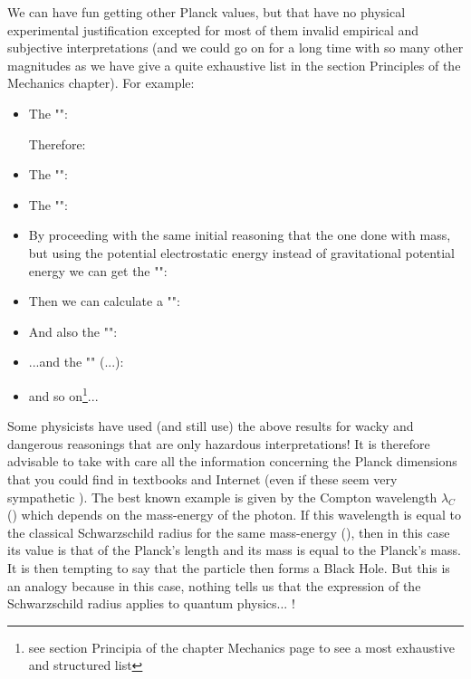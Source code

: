 	We can have fun getting other Planck values, but that have no physical experimental justification excepted for most of them invalid empirical and subjective interpretations (and we could go on for a long time with so many other magnitudes as we have give a quite exhaustive list in the section Principles of the Mechanics chapter). For example:
	\begin{itemize}
		\item The "":
		
		Therefore:
		
	
		\item The "":
		
	
		\item The "":
		
		
		\item By proceeding with the same initial reasoning that the one done with mass, but using the potential electrostatic energy instead of gravitational potential energy we can get the "":
		

		\item Then we can calculate a "":
		
		
		\item And also the "":
		
		
		\item ...and the "" (...):
		
	
		\item and so on\footnote{see section Principia of the chapter Mechanics page \pageref{planck constants} to see a most exhaustive and structured list}...
	\end{itemize}
	\begin{tcolorbox}[title=Remark,colframe=black,arc=10pt]
	Some physicists have used (and still use) the above results for wacky and dangerous reasonings that are only hazardous interpretations! It is therefore advisable to take with care all the information concerning the Planck dimensions  that you could find in textbooks and Internet (even if these seem very sympathetic ). The best known example is given by the Compton wavelength $\lambda_C$ () which depends on the mass-energy of the photon. If this wavelength is equal to the classical Schwarzschild radius for the same mass-energy (), then in this case its value is that of the Planck's length and its mass is equal to the Planck's mass. It is then tempting to say that the particle then forms a Black Hole. But this is an analogy because in this case, nothing tells us that the expression of the Schwarzschild radius applies to quantum physics... !
	\end{tcolorbox}
	
